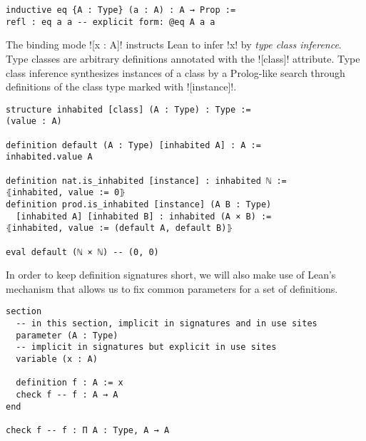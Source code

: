 \begin{verbatim}
inductive eq {A : Type} (a : A) : A → Prop :=
refl : eq a a -- explicit form: @eq A a a
\end{verbatim}

The binding mode \lean![x : A]! instructs Lean to infer \lean!x! by
\emph{type class inference}. Type classes are arbitrary definitions annotated with the
\lean![class]! attribute. Type class inference synthesizes instances of a class
by a Prolog-like search through definitions of the class type marked with \lean![instance]!.

\begin{verbatim}
structure inhabited [class] (A : Type) : Type :=
(value : A)

definition default (A : Type) [inhabited A] : A :=
inhabited.value A

definition nat.is_inhabited [instance] : inhabited ℕ :=
⦃inhabited, value := 0⦄
definition prod.is_inhabited [instance] (A B : Type)
  [inhabited A] [inhabited B] : inhabited (A × B) :=
⦃inhabited, value := (default A, default B)⦄

eval default (ℕ × ℕ) -- (0, 0)
\end{verbatim}

In order to keep definition signatures short, we will also make use of Lean's
 mechanism that allows us to fix common parameters for a set of definitions.

\begin{verbatim}
section
  -- in this section, implicit in signatures and in use sites
  parameter (A : Type)
  -- implicit in signatures but explicit in use sites
  variable (x : A)
  
  definition f : A := x
  check f -- f : A → A
end

check f -- f : Π A : Type, A → A
\end{verbatim}
